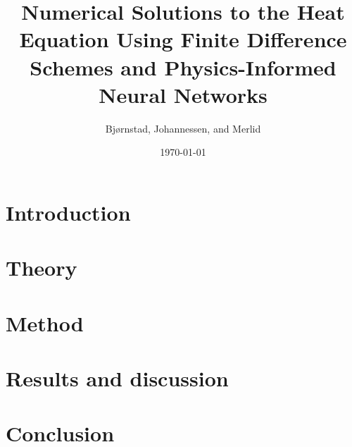 \documentclass[aps,rmp,reprint,amsmath,amssymb,twocolumn,floatfix]{revtex4-1}
\begin{document}
\title{Numerical Solutions to the Heat Equation Using Finite Difference Schemes and Physics-Informed Neural Networks}
\author{Bjørnstad, Johannessen, and Merlid}
\date{\today}


\begin{abstract}

\end{abstract}
\maketitle

\tableofcontents

\section{Introduction}
\label{sec:introduction}

\section{Theory}


\section{Method}\label{sec:methods3}


\section{Results and discussion}\label{sec:results_and_discussion}


%

\section{Conclusion}\label{sec:conclucion5}


{} %


\clearpage
\appendix
\label{appendix}

\clearpage
\end{document}
